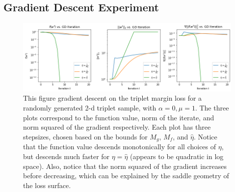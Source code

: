 \documentclass[11pt]{article}
\begin{document}




\begin{appendices}
\section{Gradient Descent Experiment}
\label{app:grad_descent}

\begin{figure}[!h]
  \centering
  \includegraphics[width=\textwidth]{figures/triplet_descent.png}
  
  \caption{\label{fig:triplet_descent}This figure gradient descent on the triplet margin loss for a randomly generated 2-d triplet sample, with $\alpha=0, \mu=1$. The three plots correspond to the function value, norm of the iterate, and norm squared of the gradient respectively. Each plot has three stepsizes, chosen based on the bounds for $M_g$, $M_f$, and $\hat{\eta}$. Notice that the function value descends monotonically for all choices of $\eta$, but descends much faster for $\eta = \hat{\eta}$ (appears to be quadratic in log space). Also, notice that the norm squared of the gradient increases before decreasing, which can be explained by the saddle geometry of the loss surface.}
\end{figure}

\end{appendices}
\end{document}
